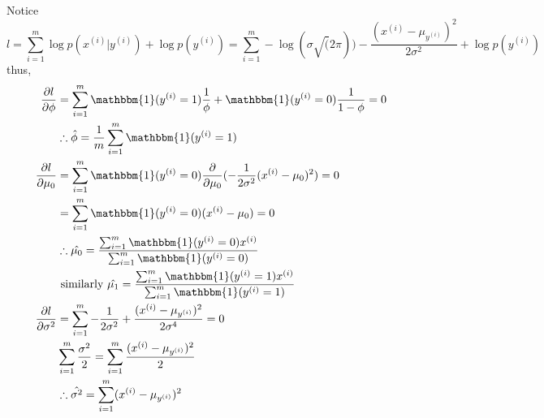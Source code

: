 \begin{answer}

Notice 
$$
l = \sum_{i=1}^m \log p(x^{(i)}|y^{(i)}) + \log p(y^{(i)})
=\sum_{i=1}^m -\log(\sigma\sqrt(2\pi)) - \frac{(x^{(i)}-\mu_{y^{(i)}})^2}{2\sigma^2} + \log p(y^{(i)})
$$
thus,
    \[
\begin{aligned}
\frac{\partial l}{\partial \phi} &= \sum_{i=1}^m \mathbbm{1}(y^{(i)}=1)\frac{1}{\phi} +\mathbbm{1}(y^{(i)}=0)\frac{1}{1- \phi} = 0\\
& \therefore \hat{\phi} = \frac{1}{m} \sum_{i=1}^m \mathbbm{1}(y^{(i)}=1)\\
\newline
\frac{\partial l}{\partial \mu_0} &= \sum_{i=1}^m \mathbbm{1}(y^{(i)}=0)\frac{\partial}{\partial \mu_0}( -\frac{1}{2\sigma^2}(x^{(i)}-\mu_0)^2) = 0\\
&= \sum_{i=1}^m \mathbbm{1}(y^{(i)}=0)(x^{(i)}-\mu_0) = 0\\
& \therefore \hat{\mu_0} =\frac{\sum_{i=1}^m \mathbbm{1}(y^{(i)}=0)x^{(i)}}{\sum_{i=1}^m \mathbbm{1}(y^{(i)}=0)} \\
& \mbox{ similarly } \hat{\mu_1} =\frac{\sum_{i=1}^m \mathbbm{1}(y^{(i)}=1)x^{(i)}}{\sum_{i=1}^m \mathbbm{1}(y^{(i)}=1)} \\
\newline
\frac{\partial l}{\partial \sigma^2} &= \sum_{i=1}^m -\frac{1}{2\sigma^2}+\frac{(x^{(i)}-\mu_{y^{(i)}})^2}{2\sigma^4} = 0\\
& \sum_{i=1}^m \frac{\sigma^2}{2} = \sum_{i=1}^m \frac{(x^{(i)}-\mu_{y^{(i)}})^2}{2} \\
& \therefore \hat{\sigma^2} =\sum_{i=1}^m (x^{(i)}-\mu_{y^{(i)}})^2\\
\end{aligned}
    \]
\end{answer}

